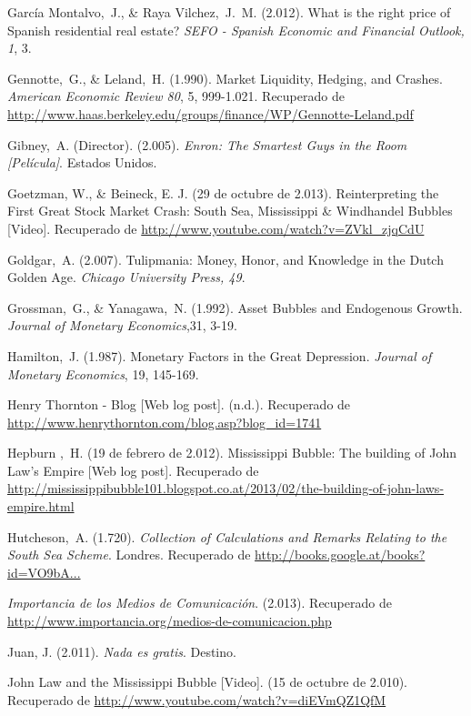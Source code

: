 \begin{thebibliography}{11}
	\bibitem{}
		García Montalvo, J., \& Raya Vilchez, J. M. (2.012). What is the right price of Spanish residential real estate? \emph{SEFO - Spanish Economic and Financial Outlook, 1}, 3.	
	
	\bibitem{}
		Gennotte, G., \& Leland, H. (1.990). Market Liquidity, Hedging, and Crashes. \emph{American Economic Review 80}, 5, 999-1.021. Recuperado de \url{http://www.haas.berkeley.edu/groups/finance/WP/Gennotte-Leland.pdf}

	\bibitem{}
		Gibney, A. (Director). (2.005). \emph{Enron: The Smartest Guys in the Room [Película]}. Estados Unidos.  

	\bibitem{}
		Goetzman, W., \& Beineck, E. J. (29 de octubre de 2.013). Reinterpreting the First Great Stock Market Crash: South Sea, Mississippi \& Windhandel Bubbles [Video]. Recuperado de \url{http://www.youtube.com/watch?v=ZVkl\_zjqCdU}

	\bibitem{}
		Goldgar, A. (2.007). Tulipmania: Money, Honor, and Knowledge in the Dutch Golden Age. \emph{Chicago University Press, 49}. 	

	\bibitem{}
		Grossman, G., \& Yanagawa, N. (1.992). Asset Bubbles and Endogenous Growth. \emph{Journal of Monetary Economics},31, 3-19.

	\bibitem{}
		Hamilton, J. (1.987). Monetary Factors in the Great Depression. \emph{Journal of Monetary Economics}, 19, 145-169. 

	\bibitem{}
		Henry Thornton - Blog [Web log post]. (n.d.). Recuperado de \url{http://www.henrythornton.com/blog.asp?blog\_id=1741}

	\bibitem{}
		Hepburn , H. (19 de febrero de 2.012). Mississippi Bubble: The building of John Law’s Empire [Web log post]. Recuperado de \url{http://mississippibubble101.blogspot.co.at/2013/02/the-building-of-john-laws-empire.html}

	\bibitem{}
		Hutcheson, A. (1.720). \emph{Collection of Calculations and Remarks Relating to the South Sea Scheme}. Londres. Recuperado de \url{http://books.google.at/books?id=VO9bA...}

	\bibitem{}
		\emph{Importancia de los Medios de Comunicación}. (2.013). Recuperado de \url{http://www.importancia.org/medios-de-comunicacion.php}

	\bibitem{}
		Juan, J. (2.011). \emph{Nada es gratis}. Destino. 

	\bibitem{}
		John Law and the Mississippi Bubble [Video]. (15 de octubre de 2.010). Recuperado de \url{http://www.youtube.com/watch?v=diEVmQZ1QfM}


\end{thebibliography}
